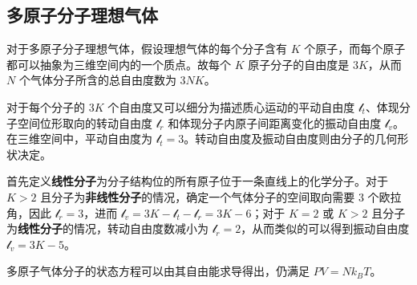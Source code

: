 \subsection{多原子分子理想气体}\label{sub_PVnRT_1}
对于多原子分子理想气体，假设理想气体的每个分子含有 $K$ 个原子，而每个原子都可以抽象为三维空间内的一个质点。故每个 $K$ 原子分子的自由度是 $3K$，从而 $N$ 个气体分子所含的总自由度数为 $3NK$。

对于每个分子的 $3K$ 个自由度又可以细分为描述质心运动的平动自由度 $\mathcal{l}_t$、体现分子空间位形取向的转动自由度 $\mathcal{l}_r$ 和体现分子内原子间距离变化的振动自由度 $\mathcal{l}_v$。在三维空间中，平动自由度为 $\mathcal{l}_t = 3$。转动自由度及振动自由度则由分子的几何形状决定。

首先定义\textbf{线性分子}为分子结构位的所有原子位于一条直线上的化学分子。对于 $K > 2$ 且分子为\textbf{非线性分子}的情况，确定一个气体分子的空间取向需要 $3$ 个欧拉角，因此 $\mathcal{l}_r = 3$，进而 $\mathcal{l}_v = 3K-\mathcal{l}_t-\mathcal{l}_r = 3K-6$；对于 $K=2$ 或 $K>2$ 且分子为\textbf{线性分子}的情况，转动自由度数减小为 $\mathcal{l}_r = 2$，从而类似的可以得到振动自由度 $\mathcal{l}_v = 3K-5$。

多原子气体分子的状态方程可以由其自由能求导得出，仍满足 $PV=Nk_BT$。